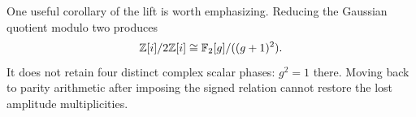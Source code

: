 One useful corollary of the lift is worth emphasizing. Reducing the Gaussian quotient modulo two produces
\begin{equation}
 \mathbb Z[i]/2\mathbb Z[i]\cong\mathbb F_2[g]/((g+1)^2).
\end{equation}
It does not retain four distinct complex scalar phases: $g^2=1$ there. Moving back to parity arithmetic after imposing the signed relation cannot restore the lost amplitude multiplicities.

\clearpage
\printbibliography[heading=bibintoc,title={References}]

